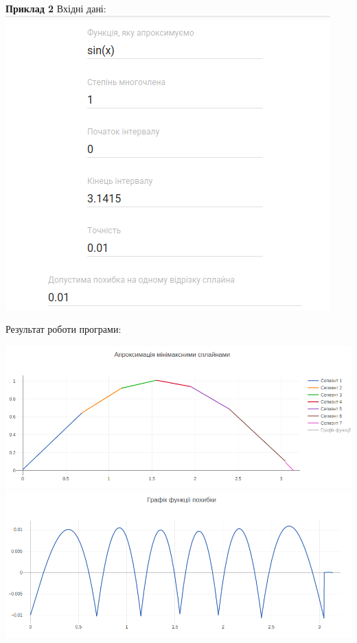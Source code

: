 \documentclass[ukrainian,14pt]{extarticle}
\begin{document}
\newpage
\textbf{Приклад 2}
Вхідні дані:
\vspace{0.5cm}
\\
\includegraphics[scale=0.7]{example_2_inputs}

\vspace{1cm}

Результат роботи програми:
\vspace{0.5cm}

\includegraphics[scale=0.5]{example2}
\includegraphics[scale=0.5]{example_2_error} \\
\vspace{0.5cm}
\end{document}
